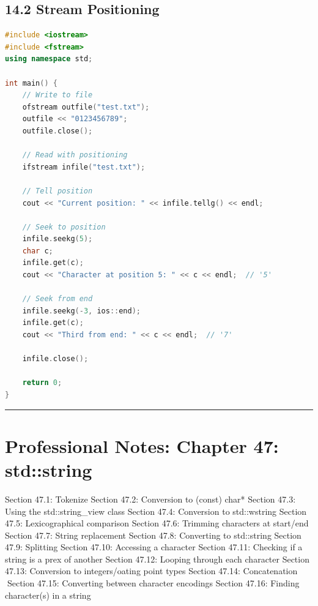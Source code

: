 \hypertarget{stream-positioning}{%
\subsection{14.2 Stream Positioning}\label{stream-positioning}}

\begin{lstlisting}[language={C++}]
#include <iostream>
#include <fstream>
using namespace std;

int main() {
    // Write to file
    ofstream outfile("test.txt");
    outfile << "0123456789";
    outfile.close();

    // Read with positioning
    ifstream infile("test.txt");

    // Tell position
    cout << "Current position: " << infile.tellg() << endl;

    // Seek to position
    infile.seekg(5);
    char c;
    infile.get(c);
    cout << "Character at position 5: " << c << endl;  // '5'

    // Seek from end
    infile.seekg(-3, ios::end);
    infile.get(c);
    cout << "Third from end: " << c << endl;  // '7'

    infile.close();

    return 0;
}
\end{lstlisting}

\begin{center}\rule{0.5\linewidth}{0.5pt}\end{center}

\hypertarget{professional-notes-chapter-47-stdstring}{%
\section{Professional Notes: Chapter 47:
std::string}\label{professional-notes-chapter-47-stdstring}}

Section 47.1: Tokenize Section 47.2: Conversion to (const) char* Section
47.3: Using the std::string\_view class Section 47.4: Conversion to
std::wstring Section 47.5: Lexicographical comparison Section 47.6:
Trimming characters at start/end Section 47.7: String replacement
Section 47.8: Converting to std::string Section 47.9: Splitting Section
47.10: Accessing a character Section 47.11: Checking if a string is a
prex of another Section 47.12: Looping through each character Section
47.13: Conversion to integers/oating point types Section 47.14:
Concatenation Section 47.15: Converting between character encodings
Section 47.16: Finding character(s) in a string

